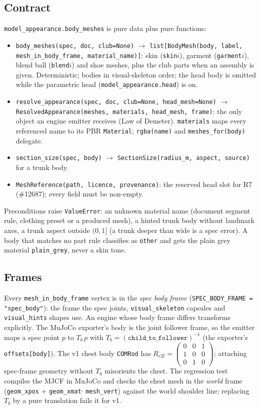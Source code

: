 \subsection{Contract}
\texttt{model\_appearance.body\_meshes} is pure data plus pure functions:
\begin{itemize}
\item \texttt{body\_meshes(spec, doc, club=None)} $\to$
  \texttt{list[BodyMesh(body, label, mesh\_in\_body\_frame, material\_name)]}:
  skin (\texttt{skin}$i$), garment (\texttt{garment}$i$), blend ball
  (\texttt{blend}$i$) and shoe meshes, plus the club parts when an assembly is
  given. Deterministic; bodies in visual-skeleton order; the head body is
  omitted while the parametric head (\texttt{model\_appearance.head}) is on.
\item \texttt{resolve\_appearance(spec, doc, club=None, head\_mesh=None)} $\to$
  \texttt{ResolvedAppearance(meshes, materials, head\_mesh, frame)}: the only
  object an engine emitter receives (Law of Demeter). \texttt{materials} maps
  every referenced name to its PBR \texttt{Material};
  \texttt{rgba(name)} and \texttt{meshes\_for(body)} delegate.
\item \texttt{section\_size(spec, body)} $\to$
  \texttt{SectionSize(radius\_m, aspect, source)} for a trunk body.
\item \texttt{MeshReference(path, licence, provenance)}: the reserved head
  slot for R7 (\#12687); every field must be non-empty.
\end{itemize}
Preconditions raise \texttt{ValueError}: an unknown material name (document
segment rule, clothing preset or a produced mesh), a hinted trunk body without
landmark axes, a trunk aspect outside $(0,1]$ (a trunk deeper than wide is a
spec error). A body that matches no part rule classifies as \texttt{other} and
gets the plain grey material \texttt{plain\_grey}, never a skin tone.

\subsection{Frames}
Every \texttt{mesh\_in\_body\_frame} vertex is in the \emph{spec body frame}
(\texttt{SPEC\_BODY\_FRAME = "spec\_body"}): the frame the spec joints,
\texttt{visual\_skeleton} capsules and \texttt{visual\_hints} shapes use. An
engine whose body frame differs transforms explicitly. The MuJoCo exporter's
body is the joint follower frame, so the emitter maps a spec point $p$ to
$T_b\,p$ with $T_b = (\texttt{child\_to\_follower})^{-1}$ (the exporter's
\texttt{offsets[body]}). The v1 chest body \texttt{COMRod} has
$R_{\mathrm{c2f}} = \left(\begin{smallmatrix}0&0&1\\1&0&0\\0&1&0\end{smallmatrix}\right)$;
attaching spec-frame geometry without $T_b$ misorients the chest. The
regression test compiles the MJCF in MuJoCo and checks the chest mesh in the
\emph{world} frame (\texttt{geom\_xpos} $+$ \texttt{geom\_xmat}$\cdot$
\texttt{mesh\_vert}) against the world shoulder line; replacing $T_b$ by a
pure translation fails it for v1.

